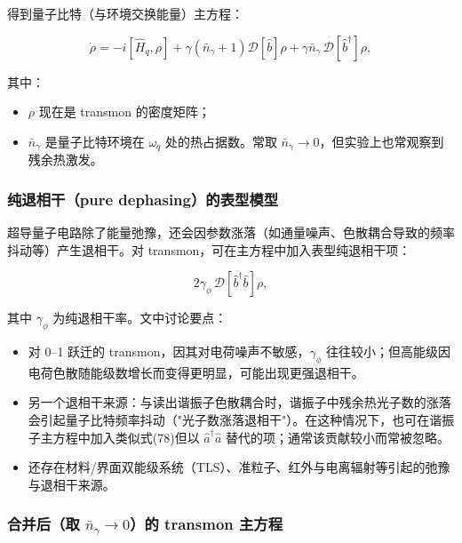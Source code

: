 \documentclass[12pt,a4paper,oneside]{ctexbook}
\begin{document}
得到量子比特（与环境交换能量）主方程：

\begin{equation}
\dot\rho=-i[\hat H_q,\rho]+\gamma(\bar n_\gamma+1)\mathcal D[\hat b]\rho
+\gamma\bar n_\gamma\,\mathcal D[\hat b^\dagger]\rho,
\tag{77}
\end{equation}

其中：
\begin{itemize}
  \item $\rho$ 现在是 transmon 的密度矩阵；
  \item $\bar n_\gamma$ 是量子比特环境在 $\omega_q$ 处的热占据数。常取 $\bar n_\gamma\to 0$，但实验上也常观察到残余热激发。
\end{itemize}

\subsubsection{纯退相干（pure dephasing）的表型模型}

超导量子电路除了能量弛豫，还会因参数涨落（如通量噪声、色散耦合导致的频率抖动等）产生退相干。对 transmon，可在主方程中加入表型纯退相干项：

\begin{equation}
2\gamma_\phi\,\mathcal D[\hat b^\dagger \hat b]\rho,
\tag{78}
\end{equation}

其中 $\gamma_\phi$ 为纯退相干率。文中讨论要点：
\begin{itemize}
  \item 对 0--1 跃迁的 transmon，因其对电荷噪声不敏感，$\gamma_\phi$ 往往较小；但高能级因电荷色散随能级数增长而变得更明显，可能出现更强退相干。
  \item 另一个退相干来源：与读出谐振子色散耦合时，谐振子中残余热光子数的涨落会引起量子比特频率抖动（"光子数涨落退相干"）。在这种情况下，也可在谐振子主方程中加入类似式(78)但以 $\hat a^\dagger \hat a$ 替代的项；通常该贡献较小而常被忽略。
  \item 还存在材料/界面双能级系统（TLS）、准粒子、红外与电离辐射等引起的弛豫与退相干来源。
\end{itemize}

\subsubsection{合并后（取 $\bar n_\gamma\to 0$）的 transmon 主方程}
\end{document}
